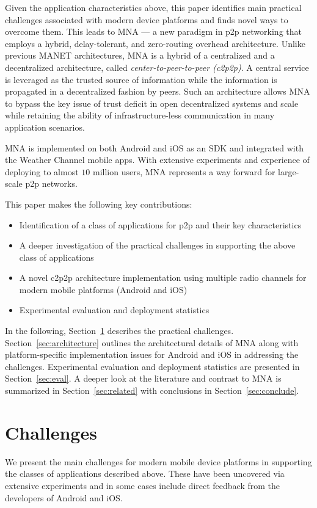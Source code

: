 \documentclass[conference]{IEEEtran}
\begin{document}
Given the application characteristics above, this paper identifies
main practical challenges associated with modern device platforms and
finds novel ways to overcome them.  This leads to MNA --- a new
paradigm in p2p networking that employs a hybrid, delay-tolerant, and
zero-routing overhead architecture.  Unlike previous MANET
architectures, MNA is a hybrid of a centralized and a decentralized
architecture, called \emph{center-to-peer-to-peer (c2p2p)}. A central service
is leveraged as the trusted source of information while the
information is propagated in a decentralized fashion by peers. Such an
architecture allows MNA to bypass the key issue of trust deficit in
open decentralized systems and scale while retaining the ability of
infrastructure-less communication in many application scenarios.

MNA is implemented on both Android and iOS as an SDK and integrated
with the Weather Channel mobile apps. With extensive experiments and
experience of deploying to almost $10$ million users, MNA represents a
way forward for large-scale p2p networks.

This paper makes the following key contributions:
\begin{itemize}
\item Identification of a class of applications for p2p and their key
  characteristics
\item A deeper investigation of the practical challenges in supporting
  the above class of applications
\item A novel c2p2p architecture implementation using multiple radio
  channels for modern mobile platforms (Android and iOS)
\item Experimental evaluation and deployment statistics
\end{itemize}

In the following, Section~\ref{sec:challenges} describes the practical
challenges. Section~\ref{sec:architecture} outlines the architectural
details of MNA along with platform-specific implementation issues for
Android and iOS in addressing the challenges. Experimental evaluation
and deployment statistics are presented in Section~\ref{sec:eval}.  A
deeper look at the literature and contrast to MNA is summarized in
Section~\ref{sec:related} with conclusions in
Section~\ref{sec:conclude}.
%
\section{Challenges}
\label{sec:challenges}
%
We present the main challenges for modern mobile device platforms in
supporting the classes of applications described above. These have been
uncovered via extensive experiments and in some cases include direct
feedback from the developers of Android and iOS.
%
\end{document}
